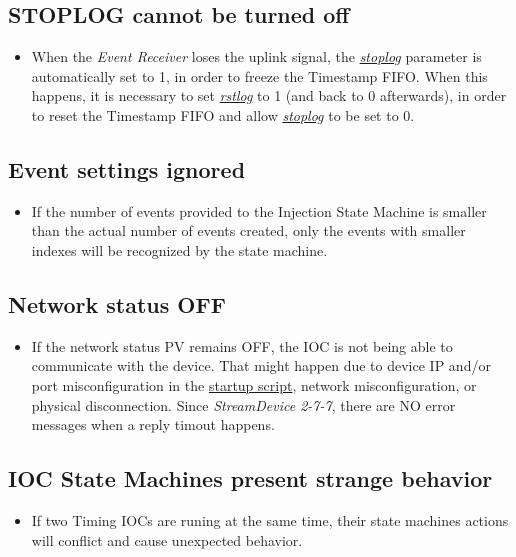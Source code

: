 \documentclass[openany]{article}
\begin{document}
	\subsection{STOPLOG cannot be turned off}

		\begin{itemize}
		\item When the \emph{Event Receiver} loses the uplink signal, the \hyperref[pvgroup:evre-timestamp-log]{\emph{stoplog}} parameter is automatically set to 1, in order to freeze the Timestamp FIFO. When this happens, it is necessary to set \hyperref[pvgroup:evre-timestamp-log]{\emph{rstlog}} to 1 (and back to 0 afterwards), in order to reset the Timestamp FIFO and allow \hyperref[pvgroup:evre-timestamp-log]{\emph{stoplog}} to be set to 0.
		\end{itemize}

	\subsection{Event settings ignored}
		\begin{itemize}
		\item If the number of events provided to the Injection State Machine is smaller than the actual number of events created, only the events with smaller indexes will be recognized by the state machine.
		\end{itemize}

	\subsection{Network status OFF}

		\begin{itemize}
		\item If the network status PV remains OFF, the IOC is not being able to communicate with the device. That might happen due to device IP and/or port misconfiguration in the \hyperref[sec:startup-script]{startup script}, network misconfiguration, or physical disconnection. Since \emph{StreamDevice 2-7-7}, there are NO error messages when a reply timout happens.
		\end{itemize}

	\subsection{IOC State Machines present strange behavior}

		\begin{itemize}
		\item If two Timing IOCs are runing at the same time, their state machines actions will conflict and cause unexpected behavior.
		\end{itemize}
\end{document}

